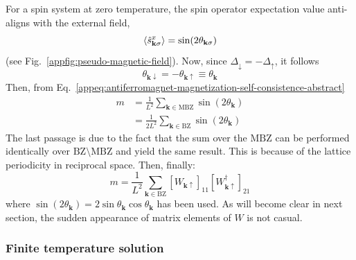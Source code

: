 For a spin system at zero temperature, the spin operator expectation value anti-aligns with the external field,
\[
	\ev{\hat s_{\mathbf{k}\sigma}^x} = \sin(2\theta_{\mathbf{k}\sigma})
\]
(see Fig.~\ref{appfig:pseudo-magnetic-field}). Now, since $\Delta_\downarrow = - \Delta_\uparrow$, it follows
\[
	\theta_{\mathbf{k}\downarrow} = -\theta_{\mathbf{k}\uparrow} \equiv \theta_\mathbf{k}
\]
Then, from Eq.~\eqref{appeq:antiferromagnet-magnetization-self-consistence-abstract}
\[
\begin{aligned}
	m &= \frac{1}{L^2} \sum_{\mathbf{k} \in \mathrm{MBZ}} \sin(2\theta_\mathbf{k}) \\
	&= \frac{1}{2L^2} \sum_{\mathbf{k} \in \mathrm{BZ}} \sin(2\theta_\mathbf{k})
\end{aligned}
\]
The last passage is due to the fact that the sum over the $\mathrm{MBZ}$ can be performed identically over $\mathrm{BZ}\setminus\mathrm{MBZ}$ and yield the same result. This is because of the lattice periodicity in reciprocal space. Then, finally:
\begin{equation}\label{appeq:antiferromagnet-magnetization-self-consistence-zero-temperature}
	m = \frac{1}{L^2} \sum_{\mathbf{k} \in \mathrm{BZ}} [ W_{\mathbf{k}\uparrow} ]_{11} [ W_{\mathbf{k}\uparrow}^\dagger ]_{21}
\end{equation}
where $\sin(2\theta_\mathbf{k}) = 2 \sin\theta_\mathbf{k} \cos\theta_\mathbf{k}$ has been used. As will become clear in next section, the sudden appearance of matrix elements of $W$ is not casual.

\subsubsection{Finite temperature solution}

